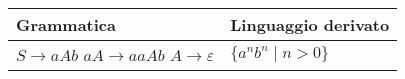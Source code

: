 \documentclass{standalone}
\begin{document}
\begin{tabularx}{\textwidth}{XX}
		Grammatica & Linguaggio derivato \\
    \midrule
        $S \to aAb$ \newline 
        $aA \to aaAb$ \newline 
        $A \to \varepsilon$ 
        & 
        $\{a^n b^n \mid n>0\}$
\end{tabularx}
\end{document}
